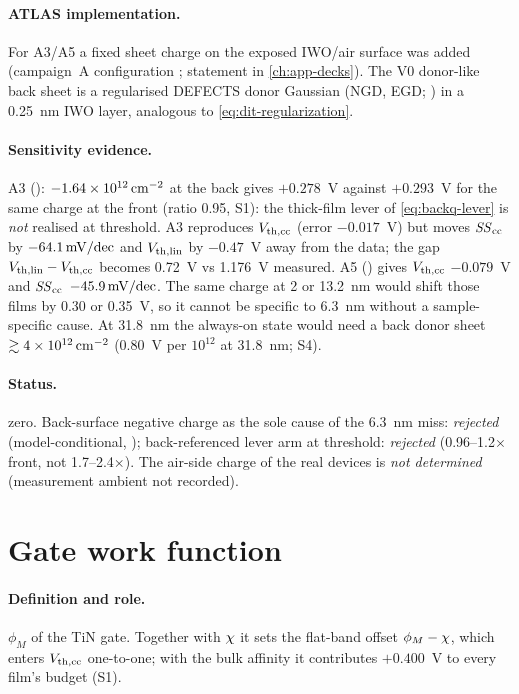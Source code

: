 \paragraph{ATLAS implementation.}
For A3/A5 a fixed sheet charge on the exposed IWO/air surface was added (campaign~A configuration
; statement in \cref{ch:app-decks}). The V0 donor-like back sheet is a
regularised DEFECTS donor Gaussian (NGD, EGD; \citealp[pp.~1170--1171]{AtlasManual}) in a 0.25~nm IWO layer, analogous to
\cref{eq:dit-regularization}.

\paragraph{Sensitivity evidence.}
A3 (): $-1.64\times10^{12}\,\mathrm{cm}^{-2}$ at the back gives $+0.278$~V against $+0.293$~V for the same charge at the
front (ratio 0.95, S1): the thick-film lever of \cref{eq:backq-lever} is \emph{not} realised at threshold. A3 reproduces
$V_{\mathrm{th,cc}}$ (error $-0.017$~V) but moves $\mathit{SS}_{\mathrm{cc}}$ by $-64.1\,\mathrm{mV/dec}$ and $V_{\mathrm{th,lin}}$ by $-0.47$~V away from the data; the gap
$V_{\mathrm{th,lin}}-V_{\mathrm{th,cc}}$ becomes 0.72~V vs 1.176~V measured. A5 () gives $V_{\mathrm{th,cc}}$ $-0.079$~V and $\mathit{SS}_{\mathrm{cc}}$
$-45.9\,\mathrm{mV/dec}$. The same charge at 2 or 13.2~nm would shift those films by 0.30 or 0.35~V, so it cannot be specific
to 6.3~nm without a sample-specific cause. At 31.8~nm the always-on state would need a back donor sheet
$\gtrsim4\times10^{12}\,\mathrm{cm}^{-2}$ (0.80~V per $10^{12}$ at 31.8~nm; S4).

\paragraph{Status.}
 zero. Back-surface negative charge as the sole cause of the 6.3~nm miss: \emph{rejected}
(model-conditional, \evPOST); back-referenced lever arm at threshold: \emph{rejected} (0.96--1.2$\times$ front, not
1.7--2.4$\times$). The air-side charge of the real devices is \emph{not determined} (measurement ambient not recorded).

\section{Gate work function}
\label{sec:par-gatewf}

\paragraph{Definition and role.}
$\phi_M$ of the TiN gate. Together with $\chi$ it sets the flat-band offset $\phi_M-\chi$, which enters
$V_{\mathrm{th,cc}}$ one-to-one; with the bulk affinity it contributes $+0.400$~V to every film's budget (S1).

